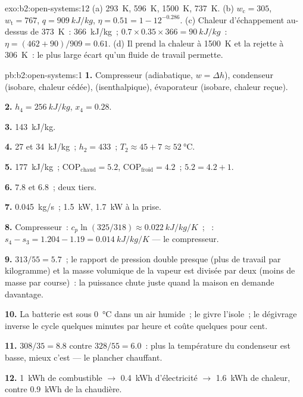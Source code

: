 \begin{solution}{exo:b2:open-systems:12}
(a) \qty{293}{K}, \qty{596}{K}, \qty{1500}{K}, \qty{737}{K}. (b) $w_{\text{c}} = 305$,
$w_{\text{t}} = 767$, $q = \qty{909}{kJ/kg}$, $\eta = 0.51 = 1 - 12^{-0.286}$. (c)
Chaleur d'échappement au-dessus de \qty{373}{K}~: \qty{366}{kJ/kg}~; $0.7 \times 0.35 \times 366 =
\qty{90}{kJ/kg}$~: $\eta = (462 + 90)/909 = 0.61$. (d) Il prend la chaleur à
\qty{1500}{K} et la rejette à \qty{306}{K}~: le plus large écart qu'un fluide
de travail permette.
\end{solution}

\begin{solution}{pb:b2:open-systems:1}
\textbf{1.} Compresseur (adiabatique, $w = \Delta h$), condenseur (isobare, chaleur
cédée),  (isenthalpique), évaporateur (isobare, chaleur reçue).

\textbf{2.} $h_4 = \qty{256}{kJ/kg}$, $x_4 = 0.28$.

\textbf{3.} \qty{143}{kJ/kg}.

\textbf{4.} \qty{27}{} et \qty{34}{kJ/kg}~; $h_2 = 433$~; $T_2 \approx 45 + 7 \approx
\qty{52}{\celsius}$.

\textbf{5.} \qty{177}{kJ/kg}~; $\mathrm{COP}_{\text{chaud}} = 5.2$, $\mathrm{COP}_{\text{froid}} = 4.2$~;
$5.2 = 4.2 + 1$.

\textbf{6.} $7.8$ et $6.8$~; deux tiers.

\textbf{7.} \qty{0.045}{kg/s}~; \qty{1.5}{kW}, \qty{1.7}{kW} à la prise.

\textbf{8.} Compresseur~: $c_p\ln(325/318) \approx \qty{0.022}{kJ/kg/K}$~;
~: $s_4 - s_3 = 1.204 - 1.19 = \qty{0.014}{kJ/kg/K}$ --- le compresseur.

\textbf{9.} $313/55 = 5.7$~; le rapport de pression double presque (plus de travail
par kilogramme) et la masse volumique de la vapeur est divisée par deux (moins de masse par course)~:
la puissance chute juste quand la maison en demande davantage.

\textbf{10.} La batterie est sous \qty{0}{\celsius} dans un air humide~; le givre
l'isole~; le dégivrage inverse le cycle quelques minutes par heure et
coûte quelques pour cent.

\textbf{11.} $308/35 = 8.8$ contre $328/55 = 6.0$~: plus la température du
condenseur est basse, mieux c'est --- le plancher chauffant.

\textbf{12.} \qty{1}{kWh} de combustible $\to$ \qty{0.4}{kWh} d'électricité $\to$
\qty{1.6}{kWh} de chaleur, contre \qty{0.9}{kWh} de la chaudière.


\end{solution}
